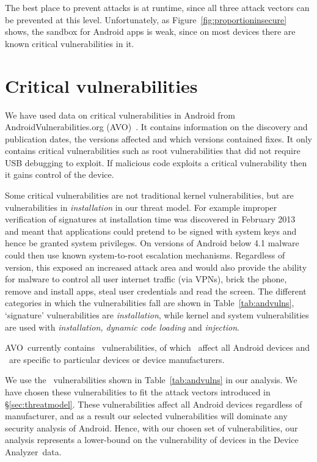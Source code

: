 \documentclass{sig-alternate-2013}
\newcommand{\da}{Device Analyzer}
\newcommand{\avo}{AVO}
\begin{document}
The best place to prevent attacks is at runtime, since all three attack vectors can be prevented at this level. 
Unfortunately, as Figure~\ref{fig:proportioninsecure} shows, the sandbox for Android apps is weak, since on most devices there are known critical vulnerabilities in it.


\section{Critical vulnerabilities}\label{sec:avo}
We have used data on critical vulnerabilities in Android from AndroidVulnerabilities.org (\avo)~\cite{androidvulnerabilities.org}.
It contains information on the discovery and publication dates, the versions affected and which versions contained fixes.
It only contains critical vulnerabilities such as root vulnerabilities that did not require USB debugging to exploit.
If malicious code exploits a critical vulnerability then it gains control of the device.

Some critical vulnerabilities are not traditional kernel vulnerabilities, but are vulnerabilities in \emph{installation} in our threat model.
For example improper verification of signatures at installation time was discovered in February 2013~\cite{Forristal2013} and meant that applications could pretend to be signed with system keys and hence be granted system privileges.
On versions of Android below 4.1 malware could then use known system-to-root escalation mechanisms.
Regardless of version, this exposed an increased attack area and would also provide the ability for malware to control all user internet traffic (via VPNs), brick the phone, remove and install apps, steal user credentials and read the screen.
The different categories in which the vulnerabilities fall are shown in Table~\ref{tab:andvulns}, `signature' vulnerabilities are \emph{installation}, while kernel and system vulnerabilities are used with \emph{installation, dynamic code loading} and \emph{injection}.
\avoTabAndVulns

\avo\ currently contains \avoNumVulnerabilities\ vulnerabilities, of which \avoNumVulnAllAndroid\ affect all Android devices and \avoNumVulnSpecific\ are specific to particular devices or device manufacturers.

We use the \daNumVulnsUsed\ vulnerabilities shown in Table~\ref{tab:andvulns} in our analysis.
We have chosen these vulnerabilities to fit the attack vectors introduced in \S\ref{sec:threatmodel}.
These vulnerabilities affect all Android devices regardless of manufacturer, and as a result our selected vulnerabilities will dominate any security analysis of Android.
Hence, with our chosen set of vulnerabilities, our analysis represents a lower-bound on the vulnerability of devices in the \da\ data.
\end{document}
